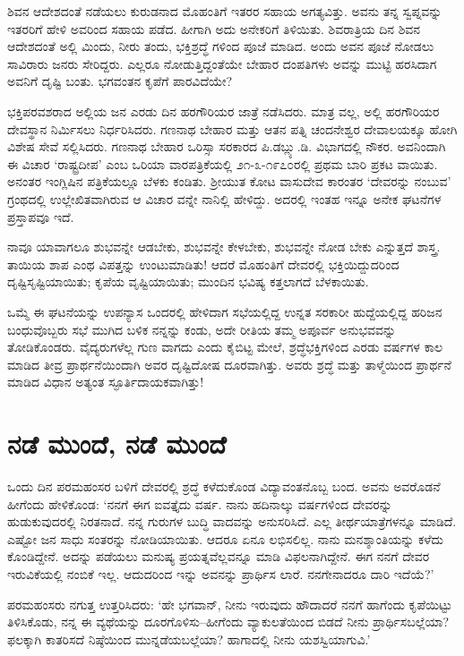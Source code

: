 ಶಿವನ ಆದೇಶದಂತೆ ನಡೆಯಲು ಕುರುಡನಾದ ಮೊಹಂತಿಗೆ ಇತರರ ಸಹಾಯ ಅಗತ್ಯವಿತ್ತು. ಅವನು ತನ್ನ ಸ್ವಪ್ನವನ್ನು ಇತರರಿಗೆ ಹೇಳಿ ಅವರಿಂದ ಸಹಾಯ ಪಡೆದ. ಹೀಗಾಗಿ ಅದು ಅನೇಕರಿಗೆ ತಿಳಿಯಿತು. ಶಿವರಾತ್ರಿಯ ದಿನ ಶಿವನ ಆದೇಶದಂತೆ ಅಲ್ಲಿ ಮಿಂದು, ನೀರು ತಂದು, ಭಕ್ತಿಶ್ರದ್ಧೆ ಗಳಿಂದ ಪೂಜೆ ಮಾಡಿದ. ಅಂದು ಅವನ ಪೂಜೆ ನೋಡಲು ಸಾವಿರಾರು ಜನರು ಸೇರಿದ್ದರು. ಎಲ್ಲರೂ ನೋಡುತ್ತಿದ್ದಂತೆಯೇ ಬೇಹಾರ ದಂಪತಿಗಳು ಅವನ್ನು ಮುಟ್ಟಿ ಹರಸಿದಾಗ ಅವನಿಗೆ ದೃಷ್ಟಿ ಬಂತು. ಭಗವಂತನ ಕೃಪೆಗೆ ಪಾರವಿದೆಯೇ?

ಭಕ್ತಿಪರವಶರಾದ ಅಲ್ಲಿಯ ಜನ ಎರಡು ದಿನ ಹರಗೌರಿಯರ ಜಾತ್ರೆ ನಡೆಸಿದರು. ಮಾತ್ರ ವಲ್ಲ, ಅಲ್ಲಿ ಹರಗೌರಿಯರ ದೇವಸ್ಥಾನ ನಿರ್ಮಿಸಲು ನಿರ್ಧರಿಸಿದರು. ಗಣನಾಥ ಬೇಹಾರ ಮತ್ತು ಆತನ ಪತ್ನಿ ಚಂದನೇಶ್ವರ ದೇವಾಲಯಕ್ಕೂ ಹೋಗಿ ವಿಶೇಷ ಸೇವೆ ಸಲ್ಲಿಸಿದರು. ಗಣನಾಥ ಬೇಹಾರ ಒರಿಸ್ಸಾ ಸರಕಾರದ ಪಿ.ಡಬ್ಲ್ಯು.ಡಿ. ವಿಭಾಗದಲ್ಲಿ ನೌಕರ. ಅವನಿಂದಾಗಿ ಈ ವಿಚಾರ ‘ರಾಷ್ಟ್ರದೀಪ’ ಎಂಬ ಒರಿಯಾ ವಾರಪತ್ರಿಕೆಯಲ್ಲಿ ೨೧-೩-೧೯೭೦ರಲ್ಲಿ ಪ್ರಥಮ ಬಾರಿ ಪ್ರಕಟ ವಾಯಿತು. ಅನಂತರ ಇಂಗ್ಲಿಷಿನ  ಪತ್ರಿಕೆಯಲ್ಲೂ ಬೆಳಕು ಕಂಡಿತು. ಶ‍್ರೀಯುತ ಕೋಟ ವಾಸುದೇವ ಕಾರಂತರ ‘ದೇವರನ್ನು ನಂಬುವ’ ಗ್ರಂಥದಲ್ಲಿ ಉಲ್ಲೇಖಿತವಾಗಿರುವ ಆ ವಿಚಾರ ವನ್ನೇ ನಾನಿಲ್ಲಿ ಹೇಳಿದ್ದು. ಅದರಲ್ಲಿ ಇಂತಹ ಇನ್ನೂ ಅನೇಕ ಘಟನೆಗಳ ಪ್ರಸ್ತಾಪವೂ ಇದೆ.

ನಾವೂ ಯಾವಾಗಲೂ ಶುಭವನ್ನೇ ಆಡಬೇಕು, ಶುಭವನ್ನೇ ಕೇಳಬೇಕು, ಶುಭವನ್ನೇ ನೋಡ ಬೇಕು ಎನ್ನುತ್ತದೆ ಶಾಸ್ತ್ರ. ತಾಯಿಯ ಶಾಪ ಎಂಥ ವಿಪತ್ತನ್ನು ಉಂಟುಮಾಡಿತು! ಆದರೆ ಮೊಹಂತಿಗೆ ದೇವರಲ್ಲಿ ಭಕ್ತಿಯಿದ್ದುದರಿಂದ ದೃಷ್ಟಿಸೃಷ್ಟಿಯಾಯಿತು; ಕೃಪೆಯ ವೃಷ್ಟಿಯಾಯಿತು; ಮುಂದಿನ ಭವಿಷ್ಯ ಕತ್ತಲಾಗದೆ ಬೆಳಕಾಯಿತು.

ಒಮ್ಮೆ ಈ ಘಟನೆಯನ್ನು ಉಪನ್ಯಾಸ ಒಂದರಲ್ಲಿ ಹೇಳಿದಾಗ ಸಭೆಯಲ್ಲಿದ್ದ ಉನ್ನತ ಸರಕಾರೀ ಹುದ್ದೆಯಲ್ಲಿದ್ದ ಹರಿಜನ ಬಂಧುವೊಬ್ಬರು ಸಭೆ ಮುಗಿದ ಬಳಿಕ ನನ್ನನ್ನು ಕಂಡು, ಅದೇ ರೀತಿಯ ತಮ್ಮ ಅಪೂರ್ವ ಅನುಭವವನ್ನು ತೋಡಿಕೊಂಡರು. ವೈದ್ಯರುಗಳೆಲ್ಲ ಗುಣ ವಾಗದು ಎಂದು ಕೈಬಿಟ್ಟ ಮೇಲೆ, ಶ್ರದ್ಧೆಭಕ್ತಿಗಳಿಂದ ಎರಡು ವರ್ಷಗಳ ಕಾಲ ಮಾಡಿದ ತೀವ್ರ ಪ್ರಾರ್ಥನೆಯಿಂದಾಗಿ ಅವರ ದೃಷ್ಟಿದೋಷ ದೂರವಾಗಿತ್ತು. ಅವರು ಶ್ರದ್ಧೆ ಮತ್ತು ತಾಳ್ಮೆಯಿಂದ ಪ್ರಾರ್ಥನೆ ಮಾಡಿದ ವಿಧಾನ ಅತ್ಯಂತ ಸ್ಫೂರ್ತಿದಾಯಕವಾಗಿತ್ತು!


\section{ನಡೆ ಮುಂದೆ, ನಡೆ ಮುಂದೆ}

ಒಂದು ದಿನ ಪರಮಹಂಸರ ಬಳಿಗೆ ದೇವರಲ್ಲಿ ಶ್ರದ್ಧೆ ಕಳೆದುಕೊಂಡ ವಿದ್ಯಾವಂತನೊಬ್ಬ ಬಂದ. ಅವನು ಅವರೊಡನೆ ಹೀಗೆಂದು ಹೇಳಿಕೊಂಡ: ‘ನನಗೆ ಈಗ ಐವತ್ತೈದು ವರ್ಷ. ನಾನು ಹದಿನಾಲ್ಕು ವರ್ಷಗಳಿಂದ ದೇವರನ್ನು ಹುಡುಕುವುದರಲ್ಲಿ ನಿರತನಾದೆ. ನನ್ನ ಗುರುಗಳ ಬುದ್ಧಿ ವಾದವನ್ನು ಅನುಸರಿಸಿದೆ. ಎಲ್ಲ ತೀರ್ಥಯಾತ್ರೆಗಳನ್ನೂ ಮಾಡಿದೆ. ಎಷ್ಟೋ ಜನ ಸಾಧು ಸಂತರನ್ನು ನೋಡಿಯಾಯಿತು. ಆದರೂ ಏನೂ ಲಭಿಸಲಿಲ್ಲ. ನಾನು ಮನಶ್ಶಾಂತಿಯನ್ನು ಕಳೆದು ಕೊಂಡಿದ್ದೇನೆ. ಅದನ್ನು ಪಡೆಯಲು ಮನುಷ್ಯ ಪ್ರಯತ್ನವೆಲ್ಲವನ್ನೂ ಮಾಡಿ ವಿಫಲನಾಗಿದ್ದೇನೆ. ಈಗ ನನಗೆ ದೇವರ ಇರುವಿಕೆಯಲ್ಲಿ ನಂಬಿಕೆ ಇಲ್ಲ. ಆದುದರಿಂದ ಇನ್ನು ಅವನನ್ನು ಪ್ರಾರ್ಥಿಸ ಲಾರೆ. ನನಗೇನಾದರೂ ದಾರಿ ಇದೆಯೆ?’

ಪರಮಹಂಸರು ನಗುತ್ತ ಉತ್ತರಿಸಿದರು: ‘ಹೇ ಭಗವಾನ್, ನೀನು ಇರುವುದು ಹೌದಾದರೆ ನನಗೆ ಹಾಗೆಂದು ಕೃಪೆಯಿಟ್ಟು ತಿಳಿಸಿಕೊಡು, ನನ್ನ ಈ ವ್ಯಥೆಯನ್ನು ದೂರಗೊಳಿಸು–ಹೀಗೆಂದು ವ್ಯಾಕುಲತೆಯಿಂದ ಬಿಡದೆ ನೀನು ಪ್ರಾರ್ಥಿಸಬಲ್ಲೆಯಾ? ಫಲಕ್ಕಾಗಿ ಕಾತರಿಸದೆ ನಿಷ್ಠೆಯಿಂದ ಮುನ್ನಡೆಯಬಲ್ಲೆಯಾ? ಹಾಗಾದಲ್ಲಿ ನೀನು ಯಶಸ್ವಿಯಾಗುವಿ.’

